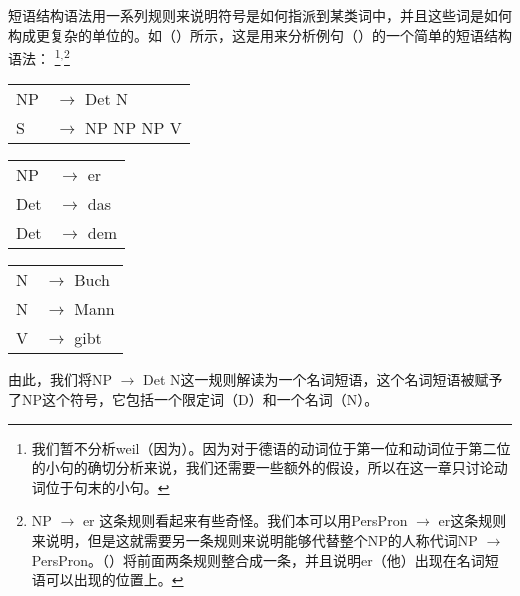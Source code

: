 短语结构语法用一系列规则来说明符号是如何指派到某类词中，并且这些词是如何构成更复杂的单位的。如（）所示，这是用来分析例句（）的一个简单的短语结构语法：
\footnote{%
我们暂不分析weil（因为）。因为对于德语的动词位于第一位和动词位于第二位的小句的确切分析来说，我们还需要一些额外的假设，所以在这一章只讨论动词位于句末的小句。
}$^,$\footnote{\label{fn-np-pron-ps-rule}%
NP $\to$ er 这条规则看起来有些奇怪。我们本可以用PersPron $\to$ er这条规则来说明，但是这就需要另一条规则来说明能够代替整个NP的人称代词NP $\to$ PersPron。（）将前面两条规则整合成一条，并且说明er（他）出现在名词短语可以出现的位置上。
}

\ea
\label{bsp-grammatik-psg}
\begin{tabular}[t]{@{}l@{ }l}
{NP} & {$\to$ Det N}\\          
{S}  & {$\to$ NP NP NP V}
\end{tabular}\hspace{2cm}%
\begin{tabular}[t]{@{}l@{ }l}
{NP} & {$\to$ er}\\
{Det}  & {$\to$ das}\\
{Det}  & {$\to$ dem}\\
\end{tabular}\hspace{8mm}
\begin{tabular}[t]{@{}l@{ }l}
{N} & {$\to$ Buch}\\
{N} & {$\to$ Mann}\\
{V} & {$\to$ gibt}\\
\end{tabular}
\z
由此，我们将NP $\to$\isc{$\to$}\is{$\to$} Det N这一规则解读为一个名词短语，这个名词短语被赋予了NP这个符号，它包括一个限定词（D）和一个名词（N）。

